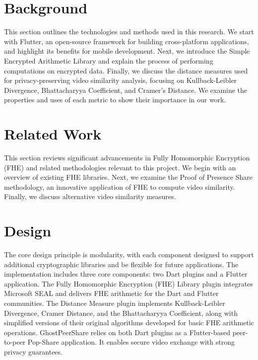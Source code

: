 \documentclass [11pt, proquest] {uwthesis}[2020/02/24]
\begin{document}




 
\chapter{Background}

This section outlines the technologies and methods used in this research. We start with Flutter, an open-source framework for building cross-platform applications, and highlight its benefits for mobile development. Next, we introduce the Simple Encrypted Arithmetic Library and explain the process of performing computations on encrypted data. Finally, we discuss the distance measures used for privacy-preserving video similarity analysis, focusing on Kullback-Leibler Divergence, Bhattacharyya Coefficient, and Cramer’s Distance. We examine the properties and uses of each metric to show their importance in our work.





 
\chapter{Related Work}

This section reviews significant advancements in Fully Homomorphic Encryption (FHE) and related methodologies relevant to this project. We begin with an overview of existing FHE libraries. Next, we examine the Proof of Presence Share methodology, an innovative application of FHE to compute video similarity. Finally, we discuss alternative video similarity measures.





 
\chapter{Design}

The core design principle is modularity, with each component designed to support additional cryptographic libraries and be flexible for future applications. The implementation includes three core components: two Dart plugins and a Flutter application. The Fully Homomorphic Encryption (FHE) Library plugin integrates Microsoft SEAL and delivers FHE arithmetic for the Dart and Flutter communities. The Distance Measure plugin implements Kullback-Leibler Divergence, Cramer Distance, and the Bhattacharyya Coefficient, along with simplified versions of their original algorithms developed for basic FHE arithmetic operations. GhostPeerShare relies on both Dart plugins as a Flutter-based peer-to-peer Pop-Share application. It enables secure video exchange with strong privacy guarantees.
\end{document}
